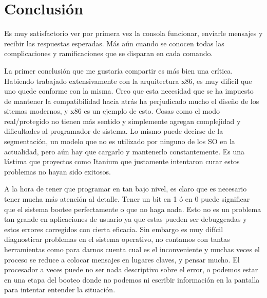 \section{Conclusión}

Es muy satisfactorio ver por primera vez la consola funcionar, enviarle
mensajes y recibir las respuestas esperadas. Más aún cuando se conocen todas
las complicaciones y ramificaciones que se disparan en cada comando.

La primer conclusión que me gustaría compartir es más bien una crítica.
Habiendo trabajado extensivamente con la arquitectura x86, es muy difícil que
uno quede conforme con la misma. Creo que esta necesidad que se ha impuesto de
mantener la compatibilidad hacia atrás ha perjudicado mucho el diseño de los
sitemas modernos, y x86 es un ejemplo de esto. Cosas como el modo
real/protegido no tienen más sentido y simplemente agregan complejidad y
dificultades al programador de sistema. Lo mismo puede decirse de la
segmentación, un modelo que no es utilizado por ninguno de los SO en la
actualidad, pero aún hay que cargarlo y mantenerlo constantemente. Es una
lástima que proyectos como Itanium que justamente intentaron curar estos
problemas no hayan sido exitosos.

A la hora de tener que programar en tan bajo nivel, es claro que es necesario
tener mucha más atención al detalle. Tener un bit en 1 ó en 0 puede significar
que el sistema bootee perfectamente o que no haga nada. Esto no es un problema
tan grande en aplicaciones de usuario ya que estas pueden ser debuggeadas y
estos errores corregidos con cierta eficacia. Sin embargo es muy difícil
diagnosticar problemas en el sistema operativo, no contamos con tantas
herramientas como para darnos cuenta cual es el inconveniente y muchas veces el
proceso se reduce a colocar mensajes en lugares claves, y pensar mucho. El
procesador a veces puede no ser nada descriptivo sobre el error, o podemos
estar en una etapa del booteo donde no podemos ni escribir información en la
pantalla para intentar entender la situación.

